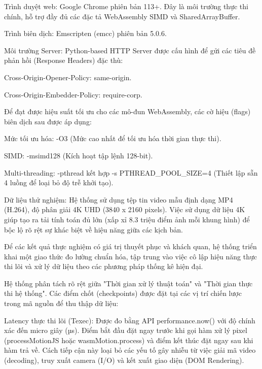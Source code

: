 Trình duyệt web: Google Chrome phiên bản 113+. Đây là môi trường thực thi chính, hỗ trợ đầy đủ các đặc tả WebAssembly SIMD và SharedArrayBuffer.


Trình biên dịch: Emscripten (emcc) phiên bản 5.0.6.


Môi trường Server: Python-based HTTP Server được cấu hình để gửi các tiêu đề phản hồi (Response Headers) đặc thù:


Cross-Origin-Opener-Policy: same-origin.


Cross-Origin-Embedder-Policy: require-corp.



Để đạt được hiệu suất tối ưu cho các mô-đun WebAssembly, các cờ hiệu (flags) biên dịch sau được áp dụng:


Mức tối ưu hóa: -O3 (Mức cao nhất để tối ưu hóa thời gian thực thi).


SIMD: -msimd128 (Kích hoạt tập lệnh 128-bit).


Multi-threading: -pthread kết hợp -s PTHREAD\_POOL\_SIZE=4 (Thiết lập sẵn 4 luồng để loại bỏ độ trễ khởi tạo).


Dữ liệu thử nghiệm: Hệ thống sử dụng tệp tin video mẫu định dạng MP4 (H.264), độ phân giải 4K UHD (3840 x 2160 pixels). Việc sử dụng dữ liệu 4K giúp tạo ra tải tính toán đủ lớn (xấp xỉ 8.3 triệu điểm ảnh mỗi khung hình) để bộc lộ rõ rệt sự khác biệt về hiệu năng giữa các kịch bản.



Để các kết quả thực nghiệm có giá trị thuyết phục và khách quan, hệ thống triển khai một giao thức đo lường chuẩn hóa, tập trung vào việc cô lập hiệu năng thực thi lõi và xử lý dữ liệu theo các phương pháp thống kê hiện đại.



Hệ thống phân tách rõ rệt giữa "Thời gian xử lý thuật toán" và "Thời gian thực thi hệ thống". Các điểm chốt (checkpoints) được đặt tại các vị trí chiến lược trong mã nguồn để thu thập dữ liệu:


Latency thực thi lõi (Texec): Được đo bằng API performance.now() với độ chính xác đến micro giây (µs). Điểm bắt đầu đặt ngay trước khi gọi hàm xử lý pixel (processMotionJS hoặc wasmMotion.process) và điểm kết thúc đặt ngay sau khi hàm trả về. Cách tiếp cận này loại bỏ các yếu tố gây nhiễu từ việc giải mã video (decoding), truy xuất camera (I/O) và kết xuất giao diện (DOM Rendering).


